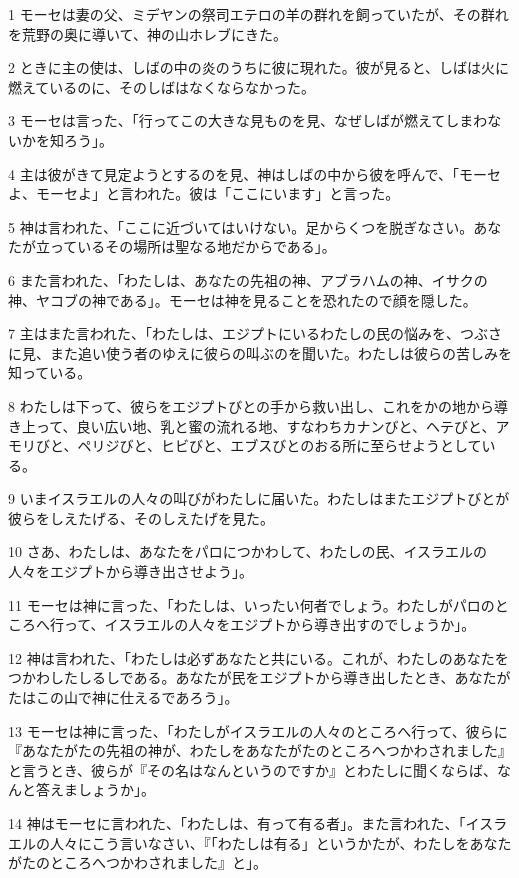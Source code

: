 \par 1 モーセは妻の父、ミデヤンの祭司エテロの羊の群れを飼っていたが、その群れを荒野の奥に導いて、神の山ホレブにきた。
\par 2 ときに主の使は、しばの中の炎のうちに彼に現れた。彼が見ると、しばは火に燃えているのに、そのしばはなくならなかった。
\par 3 モーセは言った、「行ってこの大きな見ものを見、なぜしばが燃えてしまわないかを知ろう」。
\par 4 主は彼がきて見定ようとするのを見、神はしばの中から彼を呼んで、「モーセよ、モーセよ」と言われた。彼は「ここにいます」と言った。
\par 5 神は言われた、「ここに近づいてはいけない。足からくつを脱ぎなさい。あなたが立っているその場所は聖なる地だからである」。
\par 6 また言われた、「わたしは、あなたの先祖の神、アブラハムの神、イサクの神、ヤコブの神である」。モーセは神を見ることを恐れたので顔を隠した。
\par 7 主はまた言われた、「わたしは、エジプトにいるわたしの民の悩みを、つぶさに見、また追い使う者のゆえに彼らの叫ぶのを聞いた。わたしは彼らの苦しみを知っている。
\par 8 わたしは下って、彼らをエジプトびとの手から救い出し、これをかの地から導き上って、良い広い地、乳と蜜の流れる地、すなわちカナンびと、ヘテびと、アモリびと、ペリジびと、ヒビびと、エブスびとのおる所に至らせようとしている。
\par 9 いまイスラエルの人々の叫びがわたしに届いた。わたしはまたエジプトびとが彼らをしえたげる、そのしえたげを見た。
\par 10 さあ、わたしは、あなたをパロにつかわして、わたしの民、イスラエルの人々をエジプトから導き出させよう」。
\par 11 モーセは神に言った、「わたしは、いったい何者でしょう。わたしがパロのところへ行って、イスラエルの人々をエジプトから導き出すのでしょうか」。
\par 12 神は言われた、「わたしは必ずあなたと共にいる。これが、わたしのあなたをつかわしたしるしである。あなたが民をエジプトから導き出したとき、あなたがたはこの山で神に仕えるであろう」。
\par 13 モーセは神に言った、「わたしがイスラエルの人々のところへ行って、彼らに『あなたがたの先祖の神が、わたしをあなたがたのところへつかわされました』と言うとき、彼らが『その名はなんというのですか』とわたしに聞くならば、なんと答えましょうか」。
\par 14 神はモーセに言われた、「わたしは、有って有る者」。また言われた、「イスラエルの人々にこう言いなさい、『「わたしは有る」というかたが、わたしをあなたがたのところへつかわされました』と」。
